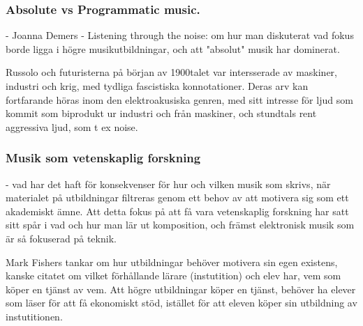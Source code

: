 \documentclass{article}
\begin{document}
\subsubsection{Absolute vs Programmatic music.}
- Joanna Demers - Listening through the noise: om hur man diskuterat vad fokus borde ligga i högre
  musikutbildningar, och att "absolut" musik har dominerat.


  Russolo och futuristerna på början av 1900talet var intersserade av maskiner, industri och krig, med tydliga
  fascistiska konnotationer. Deras arv kan fortfarande höras inom den elektroakusiska genren, med sitt
  intresse för ljud som kommit som biprodukt ur industri och från maskiner, och stundtals rent aggressiva
  ljud, som t ex noise. 




\subsubsection{Musik som vetenskaplig forskning}
- vad har det haft för konsekvenser för hur och vilken musik som skrivs, när materialet på utbildningar filtreras
  genom ett behov av att motivera sig som ett akademiskt ämne. Att detta fokus på att få vara vetenskaplig
  forskning har satt sitt spår i vad och hur man lär ut komposition, och främst elektronisk musik som är så
  fokuserad på teknik. 

  Mark Fishers tankar om hur utbildningar behöver motivera sin egen existens, kanske citatet om vilket
  förhållande lärare (instutition) och elev har, vem som köper en tjänst av vem. Att högre utbildningar
  köper en tjänst, behöver ha elever som läser för att få ekonomiskt stöd, istället för att eleven köper sin
  utbildning av instutitionen. 

	

\end{document}
